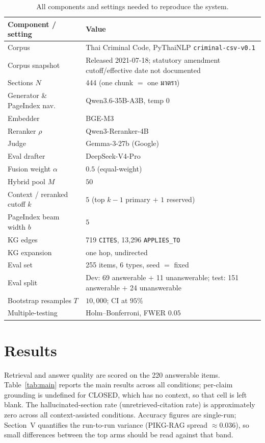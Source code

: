 \documentclass[conference]{IEEEtran}
\providecommand{\TH}{}\renewcommand{\TH}[1]{{\thaifont #1}}
\begin{document}
\begin{table}[t]
\caption{All components and settings needed to reproduce the system.}
\label{tab:hparams}
\centering
\scriptsize
\setlength{\tabcolsep}{3pt}
\begin{tabular}{@{}ll@{}}
\hline
\textbf{Component / setting} & \textbf{Value} \\
\hline
Corpus & Thai Criminal Code, PyThaiNLP \texttt{criminal-csv-v0.1} \\
Corpus snapshot & \shortstack[l]{Released 2021-07-18; statutory amendment\\cutoff/effective date not documented} \\
Sections $N$ & 444 (one chunk $=$ one \TH{มาตรา}) \\
Generator \& PageIndex nav. & Qwen3.6-35B-A3B, temp $0$ \\
Embedder & BGE-M3 \\
Reranker $\rho$ & Qwen3-Reranker-4B \\
Judge & Gemma-3-27b (Google) \\
Eval drafter & DeepSeek-V4-Pro \\
Fusion weight $\alpha$ & $0.5$ (equal-weight) \\
Hybrid pool $M$ & $50$ \\
Context / reranked cutoff $k$ & $5$ (top $k{-}1$ primary $+$ $1$ reserved) \\
PageIndex beam width $b$ & $5$ \\
KG edges & 719 \texttt{CITES}, 13{,}296 \texttt{APPLIES\_TO} \\
KG expansion & one hop, undirected \\
Eval set & 255 items, 6 types, seed $=$ fixed \\
Eval split & \shortstack[l]{Dev: 69 answerable $+$ 11 unanswerable;\\test: 151 answerable $+$ 24 unanswerable} \\
Bootstrap resamples $T$ & $10{,}000$; CI at $95\%$ \\
Multiple-testing & Holm--Bonferroni, FWER $0.05$ \\
\hline
\end{tabular}
\end{table}

\section{Results}
\label{sec:results}

Retrieval and answer quality are scored on the 220 answerable items.
Table~\ref{tab:main} reports the main results across all conditions; per-claim grounding is undefined
for CLOSED, which has no context, so that cell is left blank. The hallucinated-section rate
(unretrieved-citation rate) is approximately zero across all context-assisted conditions. Accuracy
figures are single-run; Section~V quantifies the run-to-run variance (PIKG-RAG spread $\approx0.036$),
so small differences between the top arms should be read against that band.
\end{document}
